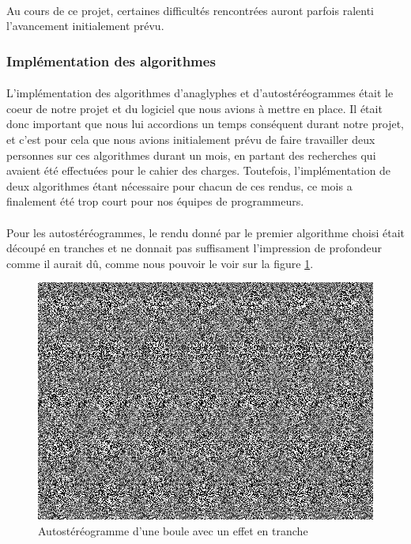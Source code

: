 \paragraph{}
Au cours de ce projet, certaines difficultés rencontrées auront parfois ralenti l'avancement initialement prévu.

\subsubsection{Implémentation des algorithmes}
\paragraph{}
L'implémentation des algorithmes d'anaglyphes et d'autostéréogrammes était le coeur de notre projet et du logiciel que nous avions à mettre en place. Il était donc important que nous lui accordions un temps conséquent durant notre projet, et c'est pour cela que nous avions initialement prévu de faire travailler deux personnes sur ces algorithmes durant un mois, en partant des recherches qui avaient été effectuées pour le cahier des charges. Toutefois, l'implémentation de deux algorithmes étant nécessaire pour chacun de ces rendus, ce mois a finalement été trop court pour nos équipes de programmeurs.

\paragraph{}
Pour les autostéréogrammes, le rendu donné par le premier algorithme choisi était découpé en tranches et ne donnait pas suffisament l'impression de profondeur comme il aurait dû, comme nous pouvoir le voir sur la figure \ref{fig:sphAutoste}.

\begin{figure}[h]
	\centering
	\includegraphics[scale=0.4]{bouleAutoste.png}
	\caption{\label{fig:sphAutoste} Autostéréogramme d'une boule avec un effet en tranche \protect}
\end{figure}

